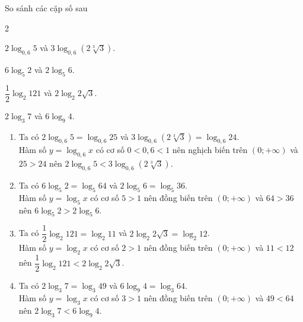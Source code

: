 \begin{baitap}
	So sánh các cặp số sau
	\begin{enumEX}[a)]{2}
		\item $2 \log _{0{,}6} 5$ và $3 \log _{0{,}6}(2 \sqrt[3]{3})$.
		\item $6 \log _5 2$ và $2 \log _5 6$.
		\item $\dfrac{1}{2} \log _2 121$ và $2 \log _2 2 \sqrt{3}$.
		\item $2 \log _3 7$ và $6 \log _9 4$.
	\end{enumEX}
	\loigiai
	{
		\begin{enumerate}
			\item Ta có $2 \log_{0{,}6} 5=\log_{0{,}6}25$ và $3 \log _{0{,}6}(2 \sqrt[3]{3}) = \log_{0{,}6}24$.\\
			Hàm số $y = \log_{0{,}6}x$ có cơ số $0<0{,}6<1$ nên nghịch biến trên $(0;+\infty)$ và $25>24$ nên $2 \log _{0{,}6} 5<3 \log _{0{,}6}(2 \sqrt[3]{3})$.
			\item Ta có $6 \log _5 2=\log_5 64$ và $2 \log _5 6=\log_5 36$.\\
			Hàm số $y=\log_5x$ có cơ số $5>1$ nên đồng biến trên $(0;+\infty)$ và $64>36$ nên $6 \log _5 2>2 \log _5 6$.
			\item Ta có $\dfrac{1}{2} \log _2 121=\log_2 11$ và $2 \log _2 2 \sqrt{3}=\log_2 12$.\\
			Hàm số $y = \log_2x$ có cơ số $2>1$ nên đồng biến trên $(0;+\infty)$ và $11<12$ nên $\dfrac{1}{2} \log _2 121<2 \log _2 2 \sqrt{3}$.
			\item Ta có $2 \log _3 7=\log_3 49$ và $6 \log _9 4=\log_3 64$.\\
			Hàm số $y = \log_3 x$ có cơ số $3>1$ nên đồng biến trên $(0;+\infty)$ và $ 49<64$ nên $2 \log _3 7<6 \log _9 4$.
		\end{enumerate}
	}
\end{baitap} 

